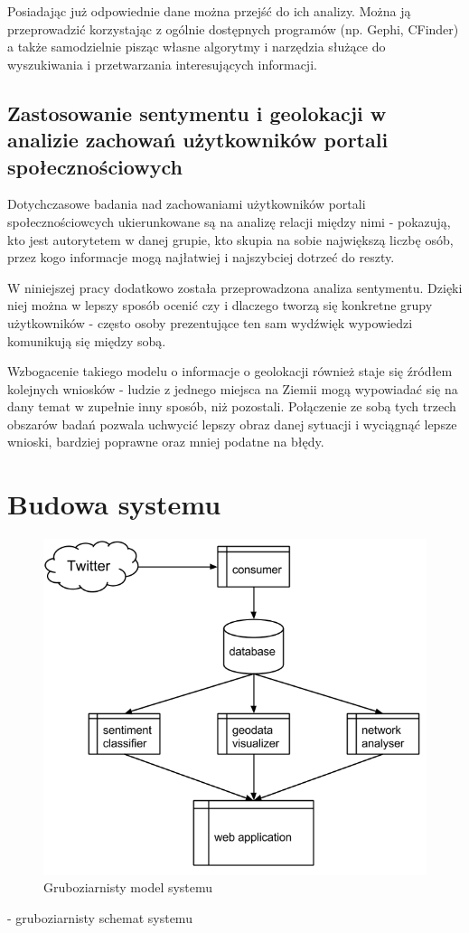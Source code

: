 Posiadając już odpowiednie dane można przejść do ich analizy. Można ją
przeprowadzić korzystając z ogólnie dostępnych programów (np. Gephi, CFinder) a
także samodzielnie pisząc własne algorytmy i narzędzia służące do wyszukiwania i
przetwarzania interesujących informacji.

\subsection{Zastosowanie sentymentu i geolokacji w analizie
zachowań użytkowników portali społecznościowych}

Dotychczasowe badania nad zachowaniami użytkowników portali społecznościowcych
ukierunkowane są na analizę relacji między nimi - pokazują, kto jest autorytetem
w danej grupie, kto skupia na sobie największą liczbę osób, przez kogo
informacje mogą najłatwiej i najszybciej dotrzeć do reszty.

W niniejszej pracy dodatkowo została przeprowadzona analiza sentymentu. Dzięki
niej można w lepszy sposób ocenić czy i dlaczego tworzą się konkretne grupy
użytkowników - często osoby prezentujące ten sam wydźwięk wypowiedzi komunikują
się między sobą.

Wzbogacenie takiego modelu o informacje o geolokacji również staje się źródłem
kolejnych wniosków - ludzie z jednego miejsca na Ziemii mogą wypowiadać się na
dany temat w zupełnie inny sposób, niż pozostali. Połączenie ze sobą tych trzech
obszarów badań pozwala uchwycić lepszy obraz danej sytuacji i wyciągnąć lepsze
wnioski, bardziej poprawne oraz mniej podatne na błędy.

\newpage \section{Budowa systemu}
\begin{figure}[ht!]
\centering
\includegraphics[width=120mm]{img/budowa-systemu.png}
\caption{Gruboziarnisty model systemu}
\label{image:model-systemu}
\end{figure}
- gruboziarnisty schemat systemu


